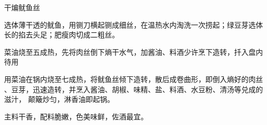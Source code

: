 \begin{recipe}{干煸鱿鱼丝}

\ingredients


\preparation

\step 选体薄干透的鱿鱼，用铡刀横起铡成细丝，在温热水内淘洗一次捞起；绿豆芽选体
长的掐去头足；肥瘦肉切成二粗丝。

\step 菜油烧至五成热，先将肉丝倒下熵干水气，加酱油、料酒少许烹下造转，扦入盘内
待用

\step 用菜油在锅内烧至七成热，将鱿鱼丝倾下造转，散后成卷曲形，即倒入熵好的肉丝
、豆芽，迅速造转，并烹入酱油、胡椒、味精、盐、料酒、水豆粉、清汤等兑成的滋汁，
颠簸炒匀，淋香油即起锅。

\features

主料干香，配料脆嫩，色美味鲜，佐酒最宜。

\end{recipe}

